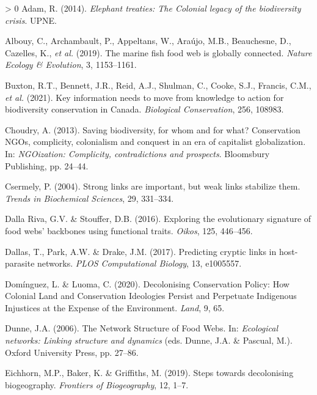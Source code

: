 \documentclass[10pt,oneside]{article}
\newlength{\cslhangindent}
\newenvironment{CSLReferences}[3] %
 {%
  \setlength{\parindent}{0pt}
  \ifodd #1 \everypar{\setlength{\hangindent}{\cslhangindent}}\ignorespaces\fi
  \ifnum #2 > 0
  \setlength{\parskip}{#2\baselineskip}
  \fi
 }%
 {}
\begin{document}
\hypertarget{refs}{}
\begin{CSLReferences}{1}{0}
\leavevmode\hypertarget{ref-Adam2014EleTre}{}%
Adam, R. (2014). \emph{Elephant treaties: The Colonial legacy of the
biodiversity crisis}. UPNE.

\leavevmode\hypertarget{ref-Albouy2019MarFis}{}%
Albouy, C., Archambault, P., Appeltans, W., Araújo, M.B., Beauchesne,
D., Cazelles, K., \emph{et al.} (2019). The marine fish food web is
globally connected. \emph{Nature Ecology \& Evolution}, 3, 1153--1161.

\leavevmode\hypertarget{ref-Buxton2021KeyInf}{}%
Buxton, R.T., Bennett, J.R., Reid, A.J., Shulman, C., Cooke, S.J.,
Francis, C.M., \emph{et al.} (2021). Key information needs to move from
knowledge to action for biodiversity conservation in Canada.
\emph{Biological Conservation}, 256, 108983.

\leavevmode\hypertarget{ref-Choudry2013SavBio}{}%
Choudry, A. (2013). Saving biodiversity, for whom and for what?
Conservation NGOs, complicity, colonialism and conquest in an era of
capitalist globalization. In: \emph{NGOization: Complicity,
contradictions and prospects}. Bloomsbury Publishing, pp. 24--44.

\leavevmode\hypertarget{ref-Csermely2004StrLin}{}%
Csermely, P. (2004). Strong links are important, but weak links
stabilize them. \emph{Trends in Biochemical Sciences}, 29, 331--334.

\leavevmode\hypertarget{ref-DallaRiva2016ExpEvo}{}%
Dalla Riva, G.V. \& Stouffer, D.B. (2016). Exploring the evolutionary
signature of food webs' backbones using functional traits. \emph{Oikos},
125, 446--456.

\leavevmode\hypertarget{ref-Dallas2017PreCry}{}%
Dallas, T., Park, A.W. \& Drake, J.M. (2017). Predicting cryptic links
in host-parasite networks. \emph{PLOS Computational Biology}, 13,
e1005557.

\leavevmode\hypertarget{ref-Dominguez2020DecCon}{}%
Domínguez, L. \& Luoma, C. (2020). Decolonising Conservation Policy: How
Colonial Land and Conservation Ideologies Persist and Perpetuate
Indigenous Injustices at the Expense of the Environment. \emph{Land}, 9,
65.

\leavevmode\hypertarget{ref-Dunne2006NetStr}{}%
Dunne, J.A. (2006). The Network Structure of Food Webs. In:
\emph{Ecological networks: Linking structure and dynamics} (eds. Dunne,
J.A. \& Pascual, M.). Oxford University Press, pp. 27--86.

\leavevmode\hypertarget{ref-Eichhorn2019SteDec}{}%
Eichhorn, M.P., Baker, K. \& Griffiths, M. (2019). Steps towards
decolonising biogeography. \emph{Frontiers of Biogeography}, 12, 1--7.


\end{CSLReferences}
\end{document}
